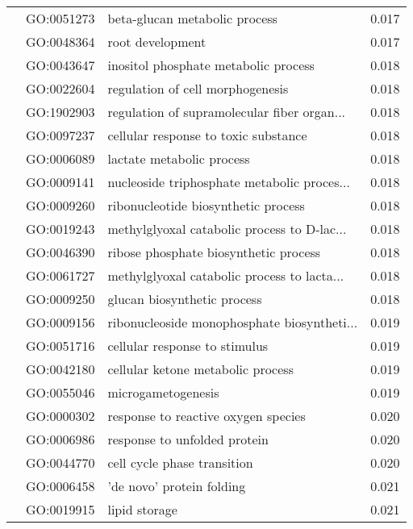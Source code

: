 \begin{longtable}{lllr}
   & GO:0051273 &                beta-glucan metabolic process &         0.017 \\
   & GO:0048364 &                             root development &         0.017 \\
   & GO:0043647 &         inositol phosphate metabolic process &         0.018 \\
   & GO:0022604 &             regulation of cell morphogenesis &         0.018 \\
   & GO:1902903 &  regulation of supramolecular fiber organ... &         0.018 \\
   & GO:0097237 &         cellular response to toxic substance &         0.018 \\
   & GO:0006089 &                    lactate metabolic process &         0.018 \\
   & GO:0009141 &  nucleoside triphosphate metabolic proces... &         0.018 \\
   & GO:0009260 &          ribonucleotide biosynthetic process &         0.018 \\
   & GO:0019243 &  methylglyoxal catabolic process to D-lac... &         0.018 \\
   & GO:0046390 &        ribose phosphate biosynthetic process &         0.018 \\
   & GO:0061727 &  methylglyoxal catabolic process to lacta... &         0.018 \\
   & GO:0009250 &                  glucan biosynthetic process &         0.018 \\
   & GO:0009156 &  ribonucleoside monophosphate biosyntheti... &         0.019 \\
   & GO:0051716 &                cellular response to stimulus &         0.019 \\
   & GO:0042180 &            cellular ketone metabolic process &         0.019 \\
   & GO:0055046 &                           microgametogenesis &         0.019 \\
   & GO:0000302 &          response to reactive oxygen species &         0.020 \\
   & GO:0006986 &                 response to unfolded protein &         0.020 \\
   & GO:0044770 &                  cell cycle phase transition &         0.020 \\
   & GO:0006458 &                    'de novo' protein folding &         0.021 \\
   & GO:0019915 &                                lipid storage &         0.021 \\

\end{longtable}
